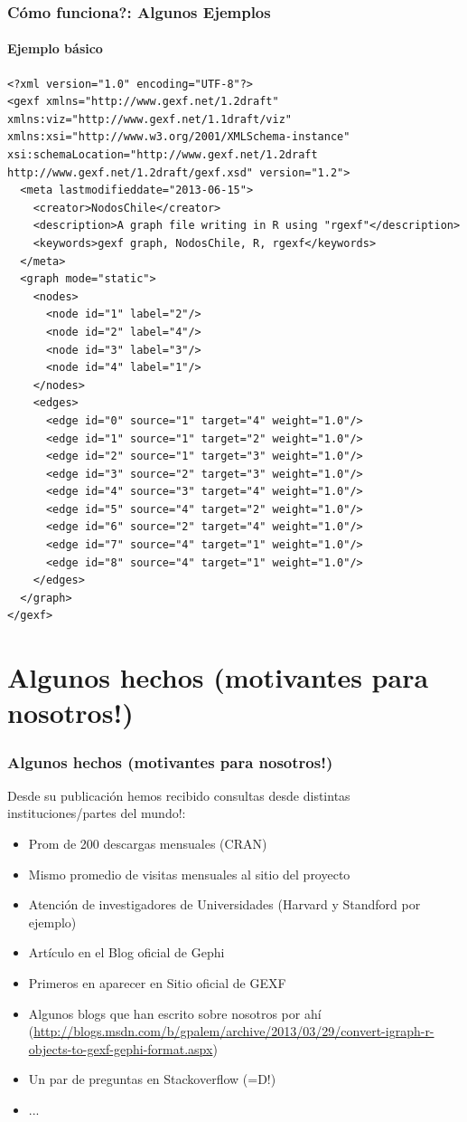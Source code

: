 \documentclass{beamer}\usepackage{graphicx, color}
\begin{document}
\begin{frame}[fragile, allowframebreaks=.8]
\frametitle{C\'omo funciona?: Algunos Ejemplos}
\framesubtitle{Ejemplo b\'asico}
\scriptsize
\begin{verbatim}
<?xml version="1.0" encoding="UTF-8"?>
<gexf xmlns="http://www.gexf.net/1.2draft" xmlns:viz="http://www.gexf.net/1.1draft/viz" xmlns:xsi="http://www.w3.org/2001/XMLSchema-instance" xsi:schemaLocation="http://www.gexf.net/1.2draft http://www.gexf.net/1.2draft/gexf.xsd" version="1.2">
  <meta lastmodifieddate="2013-06-15">
    <creator>NodosChile</creator>
    <description>A graph file writing in R using "rgexf"</description>
    <keywords>gexf graph, NodosChile, R, rgexf</keywords>
  </meta>
  <graph mode="static">
    <nodes>
      <node id="1" label="2"/>
      <node id="2" label="4"/>
      <node id="3" label="3"/>
      <node id="4" label="1"/>
    </nodes>
    <edges>
      <edge id="0" source="1" target="4" weight="1.0"/>
      <edge id="1" source="1" target="2" weight="1.0"/>
      <edge id="2" source="1" target="3" weight="1.0"/>
      <edge id="3" source="2" target="3" weight="1.0"/>
      <edge id="4" source="3" target="4" weight="1.0"/>
      <edge id="5" source="4" target="2" weight="1.0"/>
      <edge id="6" source="2" target="4" weight="1.0"/>
      <edge id="7" source="4" target="1" weight="1.0"/>
      <edge id="8" source="4" target="1" weight="1.0"/>
    </edges>
  </graph>
</gexf>
\end{verbatim}
\end{frame}

\section{Algunos hechos (motivantes para nosotros!)}


\begin{frame}
\frametitle{Algunos hechos (motivantes para nosotros!)}
Desde su publicaci\'on hemos recibido consultas desde distintas instituciones/partes del mundo!:
\begin{itemize}[<+->]
\item Prom de 200 descargas mensuales (CRAN)
\item Mismo promedio de visitas mensuales al sitio del proyecto
\item Atenci\'on de investigadores de Universidades (Harvard y Standford por ejemplo)
\item Art\'iculo en el Blog oficial de Gephi
\item Primeros en aparecer en Sitio oficial de GEXF
\item Algunos blogs que han escrito sobre nosotros por ah\'i (\url{http://blogs.msdn.com/b/gpalem/archive/2013/03/29/convert-igraph-r-objects-to-gexf-gephi-format.aspx})
\item Un par de preguntas en Stackoverflow (=D!)
\item ...
\end{itemize}
\end{frame}
\end{document}
